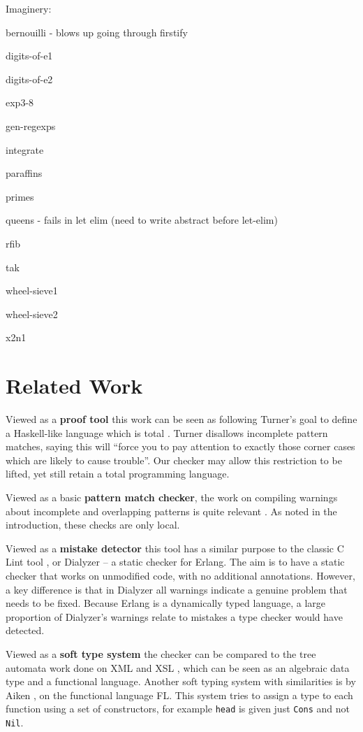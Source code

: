 \documentclass[preprint]{sigplanconf}
\newcommand{\T}[1]{\texttt{#1}}
\begin{document}
Imaginery:

bernouilli - blows up going through firstify

digits-of-e1

digits-of-e2

exp3-8

gen-regexps

integrate

paraffins

primes

queens - fails in let elim (need to write abstract before let-elim)

rfib

tak

wheel-sieve1

wheel-sieve2

x2n1

\section{Related Work}
\label{sec:related}

Viewed as a \textbf{proof tool} this work can be seen as following Turner's goal to define a Haskell-like language which is total \cite{tfp:total}. Turner disallows incomplete pattern matches, saying this will ``force you to pay attention to exactly those corner cases which are likely to cause trouble''. Our checker may allow this restriction to be lifted, yet still retain a total programming language.

Viewed as a basic \textbf{pattern match checker}, the work on compiling warnings about incomplete and overlapping patterns is quite relevant \cite{ghc,pattern_match}. As noted in the introduction, these checks are only local.

Viewed as a \textbf{mistake detector} this tool has a similar purpose to the classic C Lint tool \cite{lint}, or Dialyzer \cite{dialyzer} -- a static checker for Erlang. The aim is to have a static checker that works on unmodified code, with no additional annotations. However, a key difference is that in Dialyzer all warnings indicate a genuine problem that needs to be fixed. Because Erlang is a dynamically typed language, a large proportion of Dialyzer's warnings relate to mistakes a type checker would have detected.

Viewed as a \textbf{soft type system} the checker can be compared to the tree automata work done on XML and XSL \cite{static_xslt}, which can be seen as an algebraic data type and a functional language. Another soft typing system with similarities is by Aiken \cite{type:dynamic}, on the functional language FL. This system tries to assign a type to each function using a set of constructors, for example \T{head} is given just \T{Cons} and not \T{Nil}.
\end{document}
